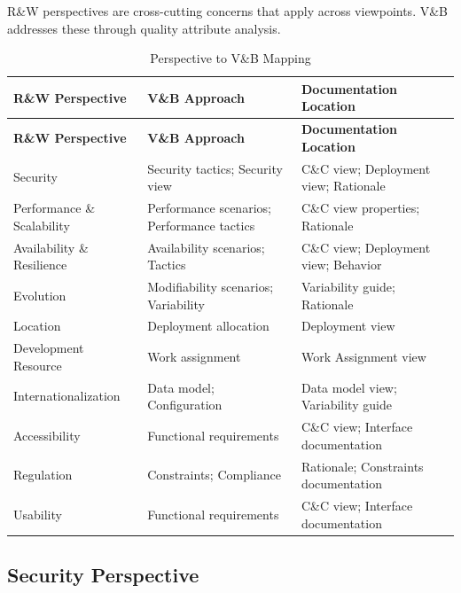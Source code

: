 \documentclass[11pt]{article}
\begin{document}
R\&W perspectives are cross-cutting concerns that apply across viewpoints. V\&B addresses these through quality attribute analysis.

\begin{longtable}{@{}L{3.4cm} L{3.8cm} L{5.3cm}@{}}
\caption{Perspective to V\&B Mapping} \\
\toprule
\textbf{R\&W Perspective} & \textbf{V\&B Approach} & \textbf{Documentation Location} \\
\midrule
\endfirsthead
\toprule
\textbf{R\&W Perspective} & \textbf{V\&B Approach} & \textbf{Documentation Location} \\
\midrule
\endhead
\bottomrule
\endlastfoot
Security & Security tactics; Security view & C\&C view; Deployment view; Rationale \\
Performance \& Scalability & Performance scenarios; Performance tactics & C\&C view properties; Rationale \\
Availability \& Resilience & Availability scenarios; Tactics & C\&C view; Deployment view; Behavior \\
Evolution & Modifiability scenarios; Variability & Variability guide; Rationale \\
Location & Deployment allocation & Deployment view \\
Development Resource & Work assignment & Work Assignment view \\
Internationalization & Data model; Configuration & Data model view; Variability guide \\
Accessibility & Functional requirements & C\&C view; Interface documentation \\
Regulation & Constraints; Compliance & Rationale; Constraints documentation \\
Usability & Functional requirements & C\&C view; Interface documentation \\
\end{longtable}

\subsection{Security Perspective}
\end{document}
